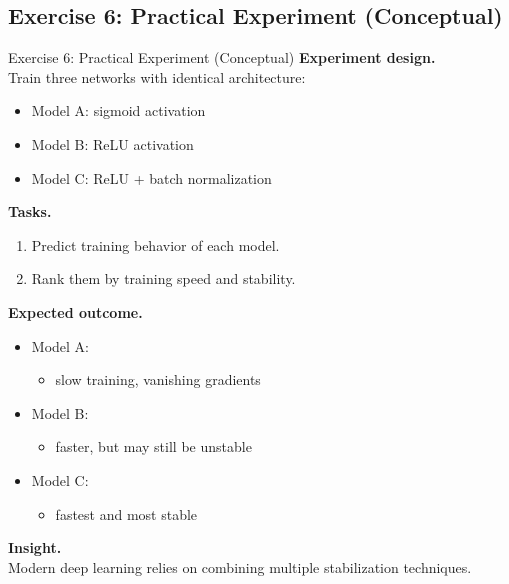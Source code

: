 \documentclass[aspectratio=169,11pt]{beamer}
\begin{document}
\subsection{Exercise 6: Practical Experiment (Conceptual)}
\begin{frame}[t,allowframebreaks]{Exercise 6: Practical Experiment (Conceptual)}
\small
\textbf{Experiment design.}\\ Train three networks with identical architecture:

\begin{itemize}
    \item Model A: sigmoid activation
    \item Model B: ReLU activation
    \item Model C: ReLU + batch normalization
\end{itemize}

\textbf{Tasks.}\\ \begin{enumerate}
    \item Predict training behavior of each model.
    \item Rank them by training speed and stability.
\end{enumerate}

\textbf{Expected outcome.}\\ \begin{itemize}
    \item Model A:
    \begin{itemize}
        \item slow training, vanishing gradients
    \end{itemize}

    \item Model B:
    \begin{itemize}
        \item faster, but may still be unstable
    \end{itemize}

    \item Model C:
    \begin{itemize}
        \item fastest and most stable
    \end{itemize}
\end{itemize}

\textbf{Insight.}\\ Modern deep learning relies on combining multiple stabilization techniques.
\end{frame}
\end{document}
